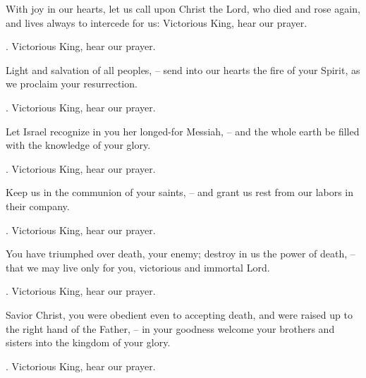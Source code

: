 \lettrine[lines=2]{W}{}ith joy in our hearts, let us call upon Christ the Lord, who died and rose again, and lives always to intercede for us: Victorious King, hear our prayer.
\par \Rbar. Victorious King, hear our prayer.

Light and salvation of all peoples,
– send into our hearts the fire of your Spirit, as we proclaim your resurrection.
\par \Rbar. Victorious King, hear our prayer.

Let Israel recognize in you her longed-for Messiah,
– and the whole earth be filled with the knowledge of your glory.
\par \Rbar. Victorious King, hear our prayer.

Keep us in the communion of your saints,
– and grant us rest from our labors in their company.
\par \Rbar. Victorious King, hear our prayer.

You have triumphed over death, your enemy; destroy in us the power of death,
– that we may live only for you, victorious and immortal Lord.
\par \Rbar. Victorious King, hear our prayer.

Savior Christ, you were obedient even to accepting death, and were raised up to the right hand of the Father,
– in your goodness welcome your brothers and sisters into the kingdom of your glory.
\par \Rbar. Victorious King, hear our prayer.